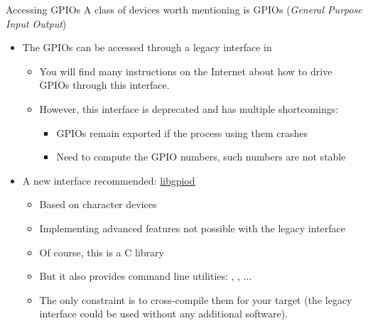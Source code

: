 \begin{frame}{Accessing GPIOs}
  A class of devices worth mentioning is GPIOs ({\em General Purpose Input Output})
  \begin{itemize}
  \item The GPIOs can be accessed through a legacy interface in
    \begin{itemize}
       \item You will find many instructions on the Internet about how
	     to drive GPIOs through this interface.
       \item However, this interface is deprecated and has multiple
             shortcomings:
             \begin{itemize}
		\item GPIOs remain exported if the process using them crashes
		\item Need to compute the GPIO numbers, such numbers are not stable
	     \end{itemize}
    \end{itemize}
  \item A new interface recommended: \href{https://git.kernel.org/pub/scm/libs/libgpiod/libgpiod.git/}{libgpiod}
    \begin{itemize}
	\item Based on  character devices
        \item Implementing advanced features not possible with the legacy interface
	\item Of course, this is a C library
        \item But it also provides command line utilities:
              , , ...
	\item The only constraint is to cross-compile them for your target
	      (the legacy interface could be used without any additional software).
    \end{itemize}
  \end{itemize}
\end{frame}

